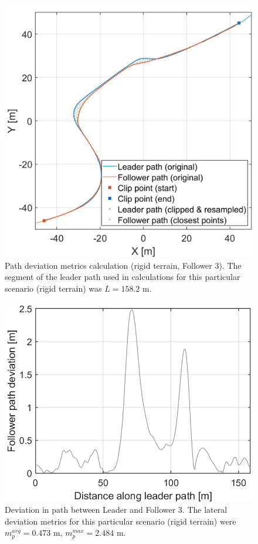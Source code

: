 \documentclass[12pt,twocolumn]{article}
\begin{document}
\begin{figure}
    \centering
    \includegraphics[width=0.9 \columnwidth]{Figs/Metrics/path.png}
    \caption{Path deviation metrics calculation (rigid terrain, Follower 3). The segment of the leader path used in calculations for this particular scenario (rigid terrain) was $L = 158.2 \text{ m}$.}
    \label{fig:metrics_path}
\end{figure}

\begin{figure}
    \centering
    \includegraphics[width=0.9\columnwidth]{Figs/Metrics/path_deviation.png}
    \caption{Deviation in path between Leader and Follower 3. The lateral deviation metrics for this particular scenario (rigid terrain) were $m_{p}^{avg} = 0.473 \text{ m}$, $m_{p}^{max} = 2.484 \text{ m}$.}   
    \label{fig:metrics_path_deviation}
\end{figure}
\end{document}
